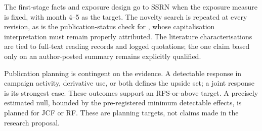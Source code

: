 The first-stage facts and exposure design go to SSRN when the exposure measure
is fixed, with month 4--5 as the target. The novelty search is repeated at every
revision, as is the publication-status check for
\textcite{celentanolevine2025}, whose capitalisation interpretation must remain
properly attributed. The literature characterisations are tied to full-text
reading records and logged quotations; the one claim based only on an
author-posted summary remains explicitly qualified.

Publication planning is contingent on the evidence. A detectable response in
campaign activity, derivative use, or both defines the upside set; a joint
response is its strongest case. These outcomes support an RFS-or-above target.
A precisely estimated null, bounded by the pre-registered minimum
detectable effects, is planned for JCF or RF. These are planning targets, not
claims made in the research proposal.
